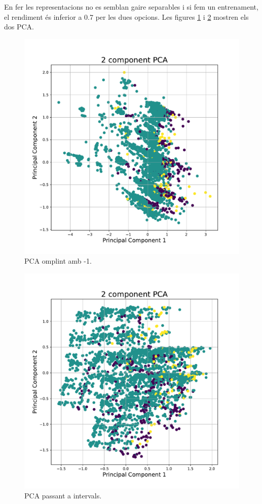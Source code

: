\documentclass[9pt,a4paper,twoside]{tau-class/tau}
\begin{document}
    En fer les representacions no es semblan gaire separables i si fem un entrenament, el rendiment és inferior a 0.7 per les dues opcions.
    Les figures \ref{fig:figure6} i \ref{fig:figure7} mostren els dos PCA.
    \begin{figure}[H]
		\centering
		\includegraphics[width=0.75\columnwidth]{PCA_df_fillna.pdf}
		\caption{PCA omplint amb -1.}
		\label{fig:figure6}
	\end{figure}\begin{figure}[H]
		\centering
		\includegraphics[width=0.75\columnwidth]{PCA_df_intervals.pdf}
		\caption{PCA passant a intervals.}
		\label{fig:figure7}
	\end{figure}
\end{document}
